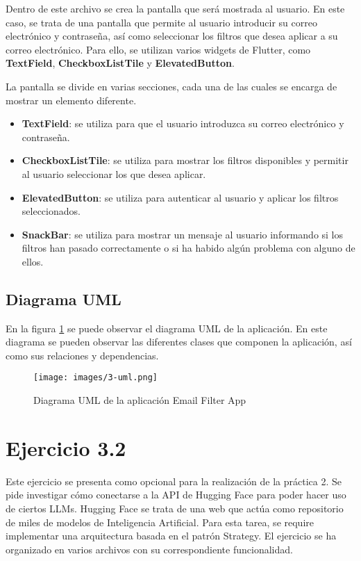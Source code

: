 \documentclass[12pt]{article}
\begin{document}
Dentro de este archivo se crea la pantalla que será mostrada al usuario. En este caso, se trata de una pantalla que permite al usuario introducir su correo electrónico y contraseña, así como seleccionar los filtros que desea aplicar a su correo electrónico. Para ello, se utilizan varios widgets de Flutter, como \textbf{TextField}, \textbf{CheckboxListTile} y \textbf{ElevatedButton}.

La pantalla se divide en varias secciones, cada una de las cuales se encarga de mostrar un elemento diferente.

\begin{itemize}
    \item \textbf{TextField}: se utiliza para que el usuario introduzca su correo electrónico y contraseña.
    \item \textbf{CheckboxListTile}: se utiliza para mostrar los filtros disponibles y permitir al usuario seleccionar los que desea aplicar.
    \item \textbf{ElevatedButton}: se utiliza para autenticar al usuario y aplicar los filtros seleccionados.
    \item \textbf{SnackBar}: se utiliza para mostrar un mensaje al usuario informando si los filtros han pasado correctamente o si ha habido algún problema con alguno de ellos.
\end{itemize}

\subsection{Diagrama UML}

En la figura \ref{fig:3-uml} se puede observar el diagrama UML de la aplicación. En este diagrama se pueden observar las diferentes clases que componen la aplicación, así como sus relaciones y dependencias.

\begin{figure}[H]
    \centering
    \texttt{[image: images/3-uml.png]}
    \caption{Diagrama UML de la aplicación Email Filter App}
    \label{fig:3-uml}
\end{figure}

\newpage

\section{Ejercicio 3.2}
Este ejercicio se presenta como opcional para la realización de la práctica 2. Se pide investigar cómo conectarse a la API de Hugging Face para poder hacer uso de ciertos LLMs. Hugging Face se trata de una web que actúa como repositorio de miles de modelos de Inteligencia Artificial.
Para esta tarea, se require implementar una arquitectura basada en el patrón Strategy. El ejercicio se ha organizado en varios archivos con su correspondiente funcionalidad.
\end{document}
